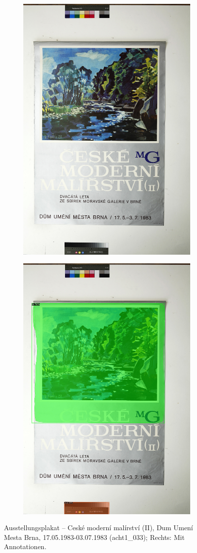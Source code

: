 \documentclass[a4paper,12pt,ngerman]{article}
\begin{document}
\newpage
\begin{landscape}
\begin{figure}[ht]
	\begin{subfigure}[b]{0.5\linewidth}
	\centering
	\includegraphics[height=\linewidth]{Abbildung_50_(acht1_033)}
	\end{subfigure}
	\begin{subfigure}[b]{0.5\linewidth}
	\centering
	\includegraphics[height=\linewidth]{Abbildung_50_(acht1_033)_with_detections}
	\end{subfigure}
	\caption{Ausstellungsplakat -- Ceské moderní malírství (II), Dum Umení Mesta Brna, 17.05.1983-03.07.1983 (acht1\_033); Rechts: Mit Annotationen.}
\end{figure}
\end{landscape}
\end{document}
